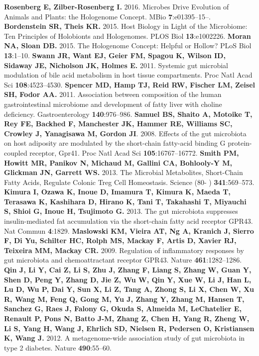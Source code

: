 \documentclass[12pt,oneside,letterpaper]{article}
\begin{document}
\begin{thebibliography}{99}
 {\bf Rosenberg E, Zilber-Rosenberg I.} 2016. Microbes Drive Evolution of Animals and Plants: the Hologenome Concept. MBio {\bf 7}:e01395–15–.
 {\bf Bordenstein SR, Theis KR.} 2015. Host Biology in Light of the Microbiome: Ten Principles of Holobionts and Hologenomes. PLOS Biol {\bf 13}:e1002226.
 {\bf Moran NA, Sloan DB.} 2015. The Hologenome Concept: Helpful or Hollow? PLoS Biol {\bf 13}:1–10.
 {\bf Swann JR, Want EJ, Geier FM, Spagou K, Wilson ID, Sidaway JE, Nicholson JK, Holmes E.} 2011. Systemic gut microbial modulation of bile acid metabolism in host tissue compartments. Proc Natl Acad Sci {\bf 108}:4523–4530.
 {\bf Spencer MD, Hamp TJ, Reid RW, Fischer LM, Zeisel SH, Fodor AA.} 2011. Association between composition of the human gastrointestinal microbiome and development of fatty liver with choline deficiency. Gastroenterology {\bf 140}:976–986.
 {\bf Samuel BS, Shaito A, Motoike T, Rey FE, Backhed F, Manchester JK, Hammer RE, Williams SC, Crowley J, Yanagisawa M, Gordon JI}. 2008. Effects of the gut microbiota on host adiposity are modulated by the short-chain fatty-acid binding G protein-coupled receptor, Gpr41. Proc Natl Acad Sci {\bf 105}:16767–16772.
 {\bf Smith PM, Howitt MR, Panikov N, Michaud M, Gallini CA, Bohlooly-Y M, Glickman JN, Garrett WS.} 2013. The Microbial Metabolites, Short-Chain Fatty Acids, Regulate Colonic Treg Cell Homeostasis. Science (80- ) {\bf 341}:569–573.
 {\bf Kimura I, Ozawa K, Inoue D, Imamura T, Kimura K, Maeda T, Terasawa K, Kashihara D, Hirano K, Tani T, Takahashi T, Miyauchi S, Shioi G, Inoue H, Tsujimoto G.} 2013. The gut microbiota suppresses insulin-mediated fat accumulation via the short-chain fatty acid receptor GPR43. Nat Commun {\bf 4}:1829.
 {\bf Maslowski KM, Vieira AT, Ng A, Kranich J, Sierro F, Di Yu, Schilter HC, Rolph MS, Mackay F, Artis D, Xavier RJ, Teixeira MM, Mackay CR.} 2009. Regulation of inflammatory responses by gut microbiota and chemoattractant receptor GPR43. Nature {\bf 461}:1282–1286.
 {\bf Qin J, Li Y, Cai Z, Li S, Zhu J, Zhang F, Liang S, Zhang W, Guan Y, Shen D, Peng Y, Zhang D, Jie Z, Wu W, Qin Y, Xue W, Li J, Han L, Lu D, Wu P, Dai Y, Sun X, Li Z, Tang A, Zhong S, Li X, Chen W, Xu R, Wang M, Feng Q, Gong M, Yu J, Zhang Y, Zhang M, Hansen T, Sanchez G, Raes J, Falony G, Okuda S, Almeida M, LeChatelier E, Renault P, Pons N, Batto J-M, Zhang Z, Chen H, Yang R, Zheng W, Li S, Yang H, Wang J, Ehrlich SD, Nielsen R, Pedersen O, Kristiansen K, Wang J.} 2012. A metagenome-wide association study of gut microbiota in type 2 diabetes. Nature {\bf 490}:55–60.

\end{thebibliography}
\end{document}
